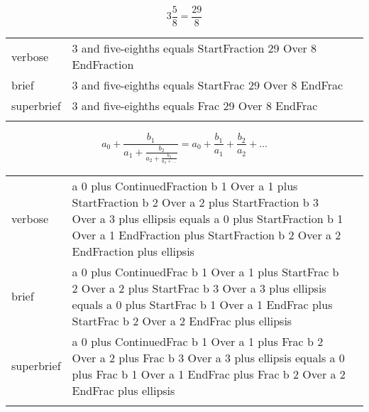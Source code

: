 \R
\E \[3\frac{5}{8} = \frac{29}{8}\]
\begin{longtable}[c]{@{}lll@{}}
\toprule\addlinespace
verbose & 3 and five-eighths equals StartFraction 29 Over 8 EndFraction
&

\\\addlinespace
brief & 3 and five-eighths equals StartFrac 29 Over 8 EndFrac &

\\\addlinespace
superbrief & 3 and five-eighths equals Frac 29 Over 8 EndFrac &

\\\addlinespace
\bottomrule
\end{longtable}


\R
\E \[a_0+\frac{b_1}{a_1+\frac{b_2}{a_2+\frac{b_3}{a_3 + \ldots}}} = a_0 + \frac{b_1}{a_1} + \frac{b_2}{a_2} + \ldots\]
\begin{longtable}[c]{@{}lll@{}}
\toprule\addlinespace
verbose & a 0 plus ContinuedFraction b 1 Over a 1 plus StartFraction b 2
Over a 2 plus StartFraction b 3 Over a 3 plus ellipsis equals a 0 plus
StartFraction b 1 Over a 1 EndFraction plus StartFraction b 2 Over a 2
EndFraction plus ellipsis &

\\\addlinespace
brief & a 0 plus ContinuedFrac b 1 Over a 1 plus StartFrac b 2 Over a 2
plus StartFrac b 3 Over a 3 plus ellipsis equals a 0 plus StartFrac b 1
Over a 1 EndFrac plus StartFrac b 2 Over a 2 EndFrac plus ellipsis &

\\\addlinespace
superbrief & a 0 plus ContinuedFrac b 1 Over a 1 plus Frac b 2 Over a 2
plus Frac b 3 Over a 3 plus ellipsis equals a 0 plus Frac b 1 Over a 1
EndFrac plus Frac b 2 Over a 2 EndFrac plus ellipsis &

\\\addlinespace
\bottomrule
\end{longtable}








